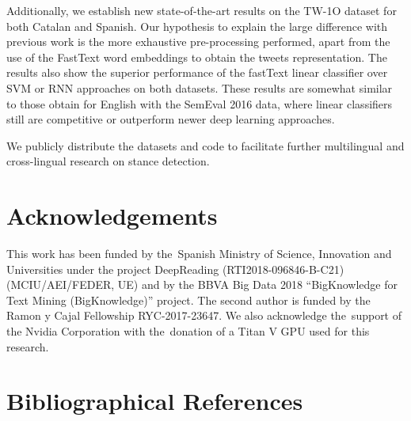 \documentclass[10pt, a4paper]{article}
\begin{document}
Additionally, we establish new state-of-the-art results on the TW-1O dataset for both Catalan and Spanish. Our hypothesis to explain the large difference with previous work is the more exhaustive pre-processing performed, apart from the use of the FastText word embeddings to obtain the tweets representation. The results also show the superior performance of the fastText linear classifier over SVM or RNN approaches on both datasets. These results are somewhat similar to those obtain for English with the SemEval 2016 data, where linear classifiers still are competitive or outperform newer deep learning approaches.

We publicly distribute the datasets and code to facilitate further multilingual and cross-lingual research on stance detection.

\section{Acknowledgements}\label{sec:acknoledgements}

This work has been funded by the~Spanish Ministry of Science, Innovation and Universities under the project DeepReading (RTI2018-096846-B-C21) (MCIU/AEI/FEDER, UE) and by the BBVA Big Data 2018 ``BigKnowledge for Text Mining (BigKnowledge)'' project. The second author is funded by the Ramon y Cajal Fellowship RYC-2017-23647. We also acknowledge the~support of the Nvidia Corporation with the~donation of a Titan V GPU used for this research.

\section{Bibliographical References}\label{main:ref}





\end{document}
